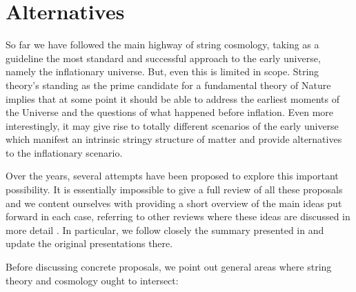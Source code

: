 
\section{Alternatives}
\label{sec:Alt}

So far we have followed the main highway of string cosmology, taking as a guideline the most standard and successful approach to the early universe, namely the inflationary universe. But, even this is limited in scope. String theory's standing as the prime candidate for a fundamental theory of Nature implies that
at some point it should be able to address the earliest moments of the Universe and the questions of what happened before inflation. 
Even more interestingly, it may give rise to totally different scenarios of the early universe which manifest an intrinsic stringy structure of matter and 
provide alternatives to the inflationary scenario. 

Over the years, several attempts have been proposed to explore this important possibility. It is essentially impossible to give a full review of 
all these proposals and we content ourselves with providing a short overview of the main ideas put forward in each case, 
referring to other reviews where these ideas are discussed in more detail \cite{Gasperini:2002bn,Lehners:2008vx,Brandenberger:2008nx,Battefeld:2005av,Brandenberger:2016vhg,McFadden:2009fg,Nastase:2019rsn}. 
In particular, we follow closely the summary presented in \cite{Quevedo:2002xw} and update the original presentations there.

Before discussing concrete proposals, we point out general areas where string theory and cosmology ought to intersect:

